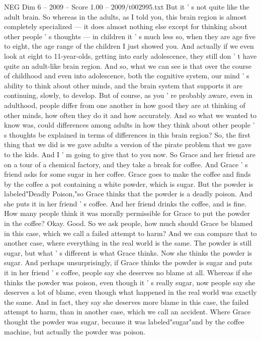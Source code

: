 \begin{textsample}{NEG Dim 6 – 2009 – Score 1.00 – 2009/t002995.txt}
But it ' s not quite like the adult brain.
So whereas in the adults, as I told you, this brain region is almost completely specialized — it does almost nothing else except for thinking about other people ' s thoughts — in children it ' s much less so, when they are age five to eight, the age range of the children I just showed you.
And actually if we even look at eight to 11-year-olds, getting into early adolescence, they still don ' t have quite an adult-like brain region.
And so, what we can see is that over the course of childhood and even into adolescence, both the cognitive system, our mind ' s ability to think about other minds, and the brain system that supports it are continuing, slowly, to develop.
But of course, as you ' re probably aware, even in adulthood, people differ from one another in how good they are at thinking of other minds, how often they do it and how accurately.
And so what we wanted to know was, could differences among adults in how they think about other people ' s thoughts be explained in terms of differences in this brain region?
So, the first thing that we did is we gave adults a version of the pirate problem that we gave to the kids.
And I ' m going to give that to you now.
So Grace and her friend are on a tour of a chemical factory, and they take a break for coffee.
And Grace ' s friend asks for some sugar in her coffee.
Grace goes to make the coffee and finds by the coffee a pot containing a white powder, which is sugar.
But the powder is labeled"Deadly Poison,"so Grace thinks that the powder is a deadly poison.
And she puts it in her friend ' s coffee.
And her friend drinks the coffee, and is fine.
How many people think it was morally permissible for Grace to put the powder in the coffee?
Okay.
Good.
So we ask people, how much should Grace be blamed in this case, which we call a failed attempt to harm?
And we can compare that to another case, where everything in the real world is the same.
The powder is still sugar, but what ' s different is what Grace thinks.
Now she thinks the powder is sugar.
And perhaps unsurprisingly, if Grace thinks the powder is sugar and puts it in her friend ' s coffee, people say she deserves no blame at all.
Whereas if she thinks the powder was poison, even though it ' s really sugar, now people say she deserves a lot of blame, even though what happened in the real world was exactly the same.
And in fact, they say she deserves more blame in this case, the failed attempt to harm, than in another case, which we call an accident.
Where Grace thought the powder was sugar, because it was labeled"sugar"and by the coffee machine, but actually the powder was poison.

\end{textsample}
